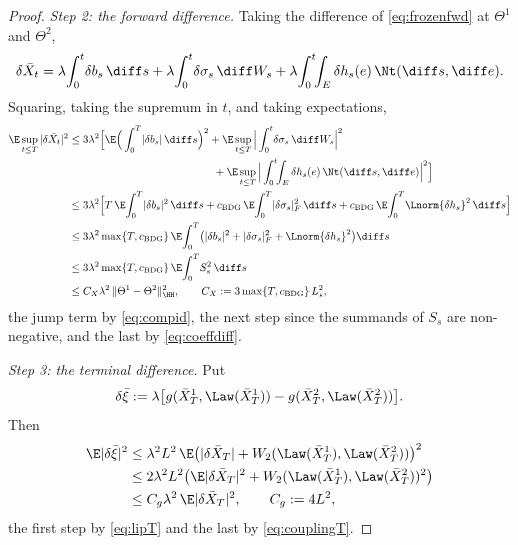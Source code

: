 \begin{proof}
\emph{Step 2: the forward difference.} Taking the difference of \eqref{eq:frozenfwd} at
$\Theta^1$ and $\Theta^2$,
\[
\delta\bar X_t=\lambda\!\int_0^t\!\delta b_s\,\diff s+\lambda\!\int_0^t\!\delta\sigma_s\,\diff W_s
+\lambda\!\int_0^t\!\!\int_E\delta h_s(e)\,\Nt(\diff s,\diff e) .
\]
Squaring, taking the supremum in $t$, and taking expectations,
\begin{equation}\label{eq:fwddiff}
\begin{aligned}
\E\sup_{t\le T}|\delta\bar X_t|^2
&\le 3\lambda^2\Big[\E\Big(\int_0^T\!|\delta b_s|\,\diff s\Big)^{2}
+\E\sup_{t\le T}\Big|\int_0^t\!\delta\sigma_s\,\diff W_s\Big|^{2}\\
&\hspace{13.4em}+\E\sup_{t\le T}\Big|\int_0^t\!\!\int_E\delta h_s(e)\,\Nt(\diff s,\diff e)\Big|^{2}\Big]\\
&\le 3\lambda^2\Big[T\,\E\!\int_0^T\!|\delta b_s|^2\,\diff s
+c_{\mathrm{BDG}}\,\E\!\int_0^T\!|\delta\sigma_s|_F^2\,\diff s
+c_{\mathrm{BDG}}\,\E\!\int_0^T\!\Lnorm{\delta h_s}^2\,\diff s\Big]\\
&\le 3\lambda^2\max\{T,c_{\mathrm{BDG}}\}\,
\E\!\int_0^T\!\big(|\delta b_s|^2+|\delta\sigma_s|_F^2+\Lnorm{\delta h_s}^2\big)\diff s\\
&\le 3\lambda^2\max\{T,c_{\mathrm{BDG}}\}\,\E\!\int_0^T\! S_s^2\,\diff s\\
&\le C_X\lambda^2\,\|\Theta^1-\Theta^2\|_{\HH}^2 ,
\qquad C_X:=3\max\{T,c_{\mathrm{BDG}}\}\,L_\star^2 ,
\end{aligned}
\end{equation}
the jump term by \eqref{eq:compid}, the next step since the summands of $S_s$ are
non-negative, and the last by \eqref{eq:coeffdiff}.

\emph{Step 3: the terminal difference.} Put
\[
\delta\bar\xi:=\lambda\big[g(\bar X^1_T,\Law(\bar X^1_T))-g(\bar X^2_T,\Law(\bar X^2_T))\big].
\]
Then
\begin{equation}\label{eq:terdiff}
\begin{aligned}
\E|\delta\bar\xi|^2
&\le\lambda^2L^2\,\E\big(|\delta\bar X_T|+W_2(\Law(\bar X^1_T),\Law(\bar X^2_T))\big)^2\\
&\le2\lambda^2L^2\big(\E|\delta\bar X_T|^2+W_2(\Law(\bar X^1_T),\Law(\bar X^2_T))^2\big)\\
&\le C_g\lambda^2\,\E|\delta\bar X_T|^2 ,\qquad C_g:=4L^2 ,
\end{aligned}
\end{equation}
the first step by \eqref{eq:lipT} and the last by \eqref{eq:couplingT}.


\end{proof}
